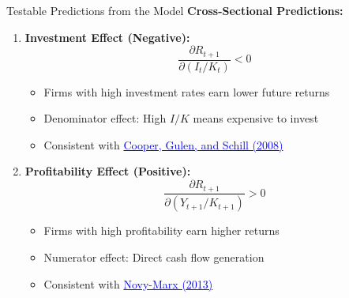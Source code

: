 \documentclass{beamer}
\begin{document}
\begin{frame}{Testable Predictions from the Model}
    \textbf{Cross-Sectional Predictions:}
    \begin{enumerate}
        \item \textbf{Investment Effect (Negative):}
        \begin{equation*}
            \frac{\partial R_{t+1}}{\partial (I_t/K_t)} < 0
        \end{equation*}
        \begin{itemize}
            \item Firms with high investment rates earn lower future returns
            \item Denominator effect: High $I/K$ means expensive to invest
            \item Consistent with \href{https://doi.org/10.1287/mnsc.2018.3036}{\textcolor{blue}{Cooper, Gulen, and Schill (2008)}} 
        \end{itemize}
        
        \item \textbf{Profitability Effect (Positive):}
        \begin{equation*}
            \frac{\partial R_{t+1}}{\partial (Y_{t+1}/K_{t+1})} > 0
        \end{equation*}
        \begin{itemize}
            \item Firms with high profitability earn higher returns
            \item Numerator effect: Direct cash flow generation
            \item Consistent with \href{https://doi.org/10.1016/j.jfineco.2013.01.003}{\textcolor{blue}{Novy-Marx (2013)}} 
        \end{itemize}
    \end{enumerate}
\end{frame}
\end{document}
